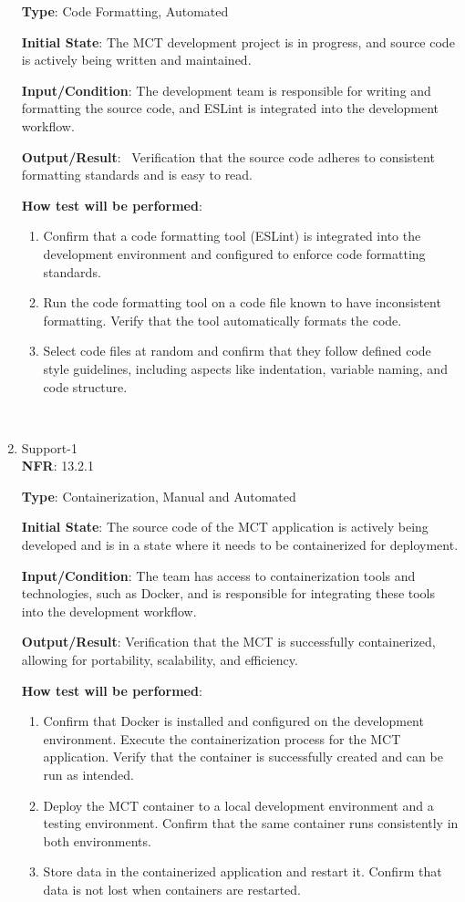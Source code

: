\documentclass[12pt, titlepage]{article}
\begin{document}
\begin{enumerate}
\textbf{Type}: Code Formatting, Automated

\textbf{Initial State}: The MCT development project is in progress, and source code is actively being written and maintained.

\textbf{Input/Condition}: The development team is responsible for writing and formatting the source code, and ESLint is integrated into the development workflow.

\textbf{Output/Result}:  Verification that the source code adheres to consistent formatting standards and is easy to read.

\textbf{How test will be performed}: 
\begin{enumerate}
    \item Confirm that a code formatting tool (ESLint) is integrated into the development environment and configured to enforce code formatting standards.
    \item Run the code formatting tool on a code file known to have inconsistent formatting. Verify that the tool automatically formats the code.
    \item Select code files at random and confirm that they follow defined code style guidelines, including aspects like indentation, variable naming, and code structure.
\end{enumerate}\\
 
    \item {Support-1\\}
\textbf{NFR}: 13.2.1

\textbf{Type}: Containerization, Manual and Automated

\textbf{Initial State}: The source code of the MCT application is actively being developed and is in a state where it needs to be containerized for deployment.

\textbf{Input/Condition}: The team has access to containerization tools and technologies, such as Docker, and is responsible for integrating these tools into the development workflow.

\textbf{Output/Result}: Verification that the MCT is successfully containerized, allowing for portability, scalability, and efficiency.

\textbf{How test will be performed}: 
\begin{enumerate}
    \item Confirm that Docker is installed and configured on the development environment. Execute the containerization process for the MCT application. Verify that the container is successfully created and can be run as intended.
    \item Deploy the MCT container to a local development environment and a testing environment. Confirm that the same container runs consistently in both environments.
    \item Store data in the containerized application and restart it. Confirm that data is not lost when containers are restarted.
\end{enumerate}


\end{enumerate}
\end{document}
